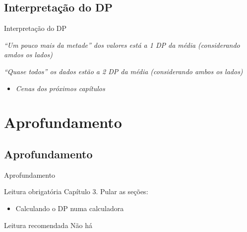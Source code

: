 \documentclass{beamer}
\begin{document}
\subsection{Interpretação do DP}

\begin{frame}{Interpretação do DP}
  \begin{block}{}
    {\em ``Um pouco mais da metade'' dos valores está a 1 DP da média (considerando amdos os lados)}
  \end{block}
  \begin{block}{}
    {\em ``Quase todos'' os dados estão a 2 DP da média (considerando ambos os lados)}
  \end{block}
  \begin{itemize}
  \item {\em Cenas dos próximos capítulos}
  \end{itemize}
\end{frame}

\section{Aprofundamento}

\subsection{Aprofundamento}

\begin{frame}{Aprofundamento}
  \begin{block}{Leitura obrigatória}
    \footnotesize
    Capítulo 3. Pular as seções:
    \begin{itemize}
      \footnotesize
    \item Calculando o DP numa calculadora
    \end{itemize}
  \end{block}
  \begin{block}{Leitura recomendada}
    \scriptsize
    Não há
  \end{block}
\end{frame}
\end{document}
